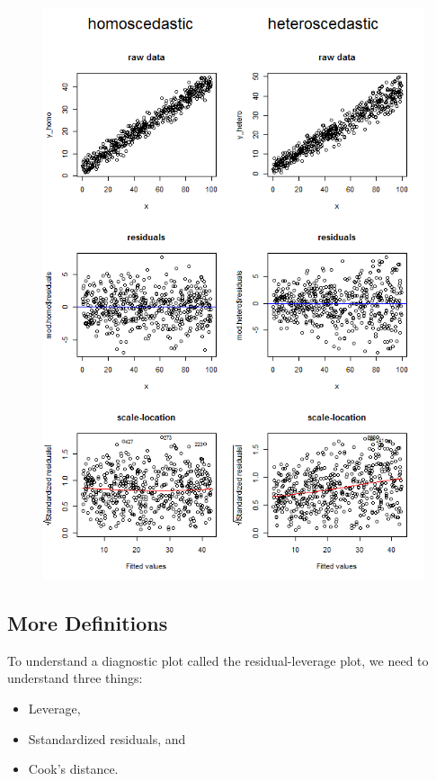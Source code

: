 \documentclass[residuals.tex]{subfiles}
\begin{document}
\newpage
\begin{figure}[h!]
\centering
\includegraphics[width=0.7\linewidth]{homosked2.png}
\caption{}
\label{fig:homosked2}
\end{figure}
\newpage



\newpage
\subsection{More Definitions}
To understand a diagnostic plot called the residual-leverage plot, we need to understand three things:

\begin{itemize}
	\item Leverage,
	\item Sstandardized residuals, and
	\item Cook's distance.
\end{itemize}
\end{document}
